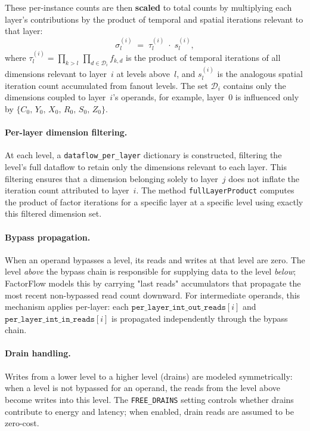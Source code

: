 \noindent
These per-instance counts are then \textbf{scaled} to total counts by
multiplying each layer's contributions by the product of temporal and
spatial iterations relevant to that layer:
%
\begin{equation}
\label{eq:ps-scaling}
  \sigma_l^{(i)} \;=\;
    \tau_l^{(i)} \;\cdot\; s_l^{(i)},
\end{equation}
%
\noindent
where $\tau_l^{(i)} = \prod_{k > l}\,\prod_{d \in \mathcal{D}_i}
f_{k,d}$ is the product of temporal iterations of all dimensions
relevant to layer~$i$ at levels above~$l$, and $s_l^{(i)}$ is the
analogous spatial iteration count accumulated from fanout levels.
The set $\mathcal{D}_i$ contains only the dimensions coupled to
layer~$i$'s operands, for example, layer~0 is influenced only by
$\{C_0,\, Y_0,\, X_0,\, R_0,\, S_0,\, Z_0\}$. 

\paragraph{Per-layer dimension filtering.}
At each level, a \texttt{dataflow\_per\_layer} dictionary is
constructed, filtering the level's full dataflow to retain only the
dimensions relevant to each layer.
This filtering ensures that a dimension belonging solely to layer~$j$
does not inflate the iteration count attributed to layer~$i$.
The method \texttt{fullLayerProduct} computes the product of factor
iterations for a specific layer at a specific level using exactly this
filtered dimension set.

\paragraph{Bypass propagation.}
When an operand bypasses a level, its reads and writes at that level
are zero.
The level \emph{above} the bypass chain is responsible for supplying
data to the level \emph{below}; FactorFlow models this by carrying
"last reads" accumulators that propagate the most recent non-bypassed
read count downward.
For intermediate operands, this mechanism applies per-layer: each
$\texttt{per\_layer\_int\_out\_reads}[i]$ and
$\texttt{per\_layer\_int\_in\_reads}[i]$ is propagated independently
through the bypass chain.

\paragraph{Drain handling.}
Writes from a lower level to a higher level (drains) are modeled
symmetrically: when a level is not bypassed for an operand, the reads
from the level above become writes into this level.
The \texttt{FREE\_DRAINS} setting controls whether drains contribute
to energy and latency; when enabled, drain reads are assumed to be
zero-cost.

